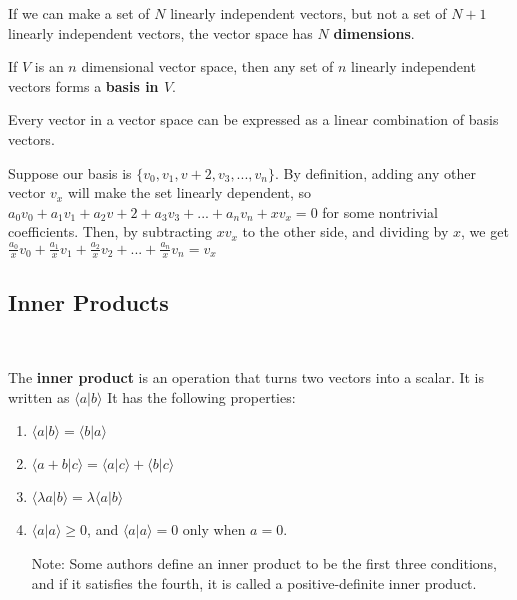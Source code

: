 \documentclass{article}
\begin{document}
\begin{definition}
If we can make a set of $N$ linearly independent vectors, but not a set of $N+1$ linearly independent vectors, the vector space has $N$ \textbf{dimensions}. 
\end{definition}

\begin{definition}
If $V$ is an $n$ dimensional vector space, then any set of $n$ linearly independent vectors forms a \textbf{basis in $V$}. 
\end{definition}

\begin{theorem}
Every vector in a vector space can be expressed as a linear combination of basis vectors. 
\end{theorem}
\begin{customproof}
Suppose our basis is $\{v_0 , v_1 , v+2 , v_3 , ... ,v_n\}$. By definition, adding any other vector $v_x$ will make the set linearly dependent, so $a_0v_0 + a_1v_1 + a_2v+2 + a_3v_3 + ... + a_nv_n + xv_x = 0$ for some nontrivial coefficients. Then, by subtracting $xv_x$ to the other side, and dividing by $x$, we get $\frac{a_0}{x} v_0 + \frac{a_1}{x} v_1 + \frac{a_2}{x} v_2 + ... + \frac{a_n}{x}v_n = v_x$
\end{customproof}

\subsection{Inner Products}
\
\begin{definition}
The \textbf{inner product} is an operation that turns two vectors into a scalar. It is written as $\langle a\vert b\rangle$ It has the following properties:
\begin{enumerate}
    \item $\langle a\vert b \rangle = \langle b\vert a \rangle$
    \item $\langle a + b \vert c \rangle = \langle a \vert c \rangle + \langle b \vert c \rangle$
    \item $\langle \lambda a \vert b \rangle = \lambda \langle a \vert b \rangle$
    \item   $\langle a\vert a \rangle \geq 0$, and $\langle a\vert a \rangle = 0$ only when $a = 0$.
    
    Note: Some authors define an inner product to be the first three conditions, and if it satisfies the fourth, it is called a positive-definite inner product. 
\end{enumerate}
\end{definition}
\end{document}

